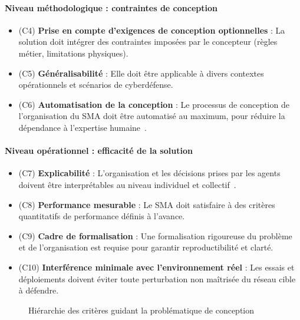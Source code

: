 \documentclass[ twoside,openright,titlepage,numbers=noenddot,headinclude,%
                footinclude=true,cleardoublepage=empty,abstractoff, %
                BCOR=5mm,paper=a4,fontsize=11pt,%
                french,american,%
                ]{scrreprt}
\begin{document}
\paragraph{Niveau méthodologique : contraintes de conception}
\begin{itemize}
    \item (C4) \textbf{Prise en compte d'exigences de conception optionnelles} : La solution doit intégrer des contraintes imposées par le concepteur (règles métier, limitations physiques).
    \item (C5) \textbf{Généralisabilité} : Elle doit être applicable à divers contextes opérationnels et scénarios de cyberdéfense.
    \item (C6) \textbf{Automatisation de la conception} : Le processus de conception de l'organisation du SMA doit être automatisé au maximum, pour réduire la dépendance à l'expertise humaine~\cite{Dennis2012}.
\end{itemize}

\paragraph{Niveau opérationnel : efficacité de la solution}
\begin{itemize}
    \item (C7) \textbf{Explicabilité} : L'organisation et les décisions prises par les agents doivent être interprétables au niveau individuel et collectif~\cite{Boella2008}.
    \item (C8) \textbf{Performance mesurable} : Le SMA doit satisfaire à des critères quantitatifs de performance définis à l'avance.
    \item (C9) \textbf{Cadre de formalisation} : Une formalisation rigoureuse du problème et de l'organisation est requise pour garantir reproductibilité et clarté.
    \item (C10) \textbf{Interférence minimale avec l'environnement réel} : Les essais et déploiements doivent éviter toute perturbation non maîtrisée du réseau cible à défendre.
\end{itemize}

\begin{figure}[h]
    \centering
    \caption{Hiérarchie des critères guidant la problématique de conception}
    \label{fig:aica-criteria}
\end{figure}
\end{document}
